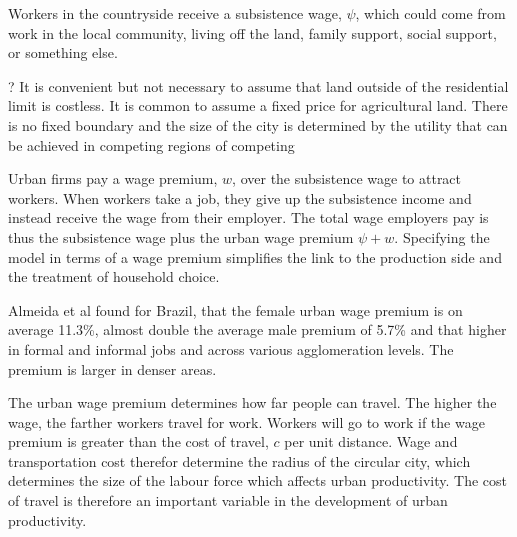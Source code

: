 Workers in the countryside receive a subsistence wage, $\psi$, which could come from work in the local community, living off the land, family support, social support, or something else. %




? It is convenient but not necessary to assume that land outside of the residential limit is costless. It is common to assume a fixed price for agricultural land. There is no fixed boundary and the size of the city is determined by the utility that can be achieved in competing regions of competing


Urban firms pay a wage premium, $w$, over the subsistence wage to attract workers. 
When workers take a job, they give up the subsistence income and instead receive the wage from their employer. 
The total wage employers pay is thus the subsistence wage plus the urban wage premium  $\psi + w$.
Specifying the model in terms of a wage premium simplifies the link to the production side and the treatment of household choice.

Almeida et al \cite{almeidaUrbanWagePremium2022} found for Brazil, that the female urban wage premium is on average 11.3\%, almost double the average male premium of 5.7\% and that higher in formal and informal jobs and across various agglomeration levels. The premium is larger in denser areas.

The \gls{urban wage premium} determines how far people can travel. The higher the wage, the farther workers travel for work. 
Workers will go to work if the wage premium is greater than the cost of travel, ${c}$ per unit distance. 
Wage and transportation cost therefor determine the radius of the circular city, which determines the size of the labour force which affects urban productivity.  The cost of travel is therefore an important variable in the development of urban productivity. 


